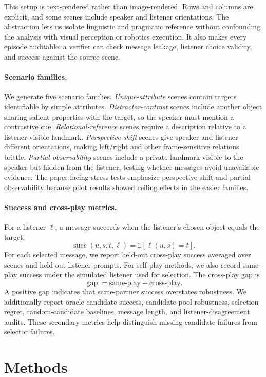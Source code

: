 \documentclass[10pt]{article}
\begin{document}
This setup is text-rendered rather than image-rendered. Rows and columns are explicit, and some scenes include speaker and listener orientations. The abstraction lets us isolate linguistic and pragmatic reference without confounding the analysis with visual perception or robotics execution. It also makes every episode auditable: a verifier can check message leakage, listener choice validity, and success against the source scene.

\paragraph{Scenario families.}
We generate five scenario families. \emph{Unique-attribute} scenes contain targets identifiable by simple attributes. \emph{Distractor-contrast} scenes include another object sharing salient properties with the target, so the speaker must mention a contrastive cue. \emph{Relational-reference} scenes require a description relative to a listener-visible landmark. \emph{Perspective-shift} scenes give speaker and listener different orientations, making left/right and other frame-sensitive relations brittle. \emph{Partial-observability} scenes include a private landmark visible to the speaker but hidden from the listener, testing whether messages avoid unavailable evidence. The paper-facing stress tests emphasize perspective shift and partial observability because pilot results showed ceiling effects in the easier families.

\paragraph{Success and cross-play metrics.}
For a listener $\ell$, a message succeeds when the listener's chosen object equals the target:
\[
  \operatorname{succ}(u,s,t,\ell) = \mathbb{1}[\ell(u,s)=t].
\]
For each selected message, we report held-out cross-play success averaged over scenes and held-out listener prompts. For self-play methods, we also record same-play success under the simulated listener used for selection. The cross-play gap is
\[
  \operatorname{gap} = \text{same-play} - \text{cross-play}.
\]
A positive gap indicates that same-partner success overstates robustness. We additionally report oracle candidate success, candidate-pool robustness, selection regret, random-candidate baselines, message length, and listener-disagreement audits. These secondary metrics help distinguish missing-candidate failures from selector failures.

\section{Methods}
\end{document}
